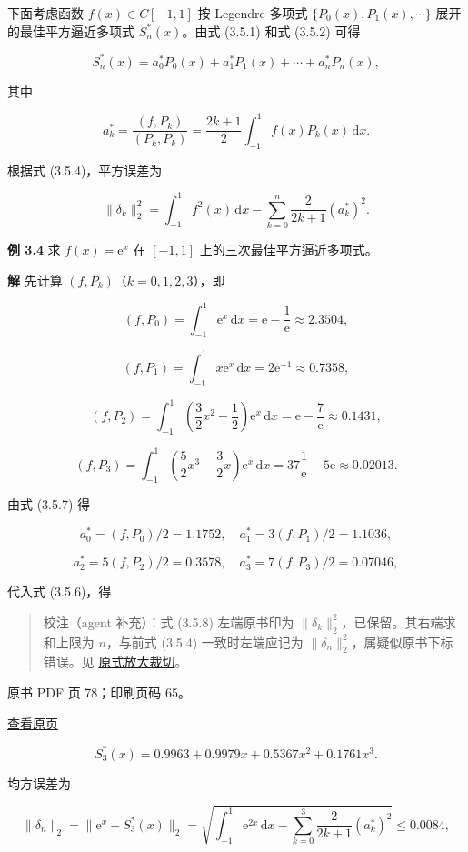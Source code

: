 下面考虑函数 \(f(x)\in C[-1,1]\) 按 Legendre 多项式 \(\{P_0(x),P_1(x),\cdots\}\) 展开的最佳平方逼近多项式 \(S_n^*(x)\)。由式 (3.5.1) 和式 (3.5.2) 可得

\[
S_n^*(x)=a_0^*P_0(x)+a_1^*P_1(x)+\cdots+a_n^*P_n(x),\tag{3.5.6}
\]

其中

\[
a_k^*=\frac{(f,P_k)}{(P_k,P_k)}=\frac{2k+1}{2}\int_{-1}^1f(x)P_k(x)\,\mathrm dx.\tag{3.5.7}
\]

根据式 (3.5.4)，平方误差为

\[
\|\delta_k\|_2^2=\int_{-1}^1 f^2(x)\,\mathrm dx-\sum_{k=0}^n\frac{2}{2k+1}(a_k^*)^2.\tag{3.5.8}
\]

\textbf{例 3.4} 求 \(f(x)=\mathrm e^x\) 在 \([-1,1]\) 上的三次最佳平方逼近多项式。

\textbf{解} 先计算 \((f,P_k)\)（\(k=0,1,2,3\)），即

\[
(f,P_0)=\int_{-1}^1\mathrm e^x\,\mathrm dx=\mathrm e-\frac1{\mathrm e}\approx2.3504,
\]

\[
(f,P_1)=\int_{-1}^1x\mathrm e^x\,\mathrm dx=2\mathrm e^{-1}\approx0.7358,
\]

\[
(f,P_2)=\int_{-1}^1\left(\frac32x^2-\frac12\right)\mathrm e^x\,\mathrm dx=\mathrm e-\frac7{\mathrm e}\approx0.1431,
\]

\[
(f,P_3)=\int_{-1}^1\left(\frac52x^3-\frac32x\right)\mathrm e^x\,\mathrm dx=37\frac1{\mathrm e}-5\mathrm e\approx0.02013.
\]

由式 (3.5.7) 得

\[
a_0^*=(f,P_0)/2=1.1752,\quad a_1^*=3(f,P_1)/2=1.1036,
\]

\[
a_2^*=5(f,P_2)/2=0.3578,\quad a_3^*=7(f,P_3)/2=0.07046,
\]

代入式 (3.5.6)，得

\begin{quote}
校注（agent 补充）：式 (3.5.8) 左端原书印为 \(\|\delta_k\|_2^2\)，已保留。其右端求和上限为 \(n\)，与前式 (3.5.4) 一致时左端应记为 \(\|\delta_n\|_2^2\)，属疑似原书下标错误。见 \href{verified/assets/ch03b/p077-error-formula.png}{原式放大裁切}。
\end{quote}

\clearpage

原书 PDF 页 78；印刷页码 65。

\href{source-images/pdf-078.jpeg}{查看原页}

\[
S_3^*(x)=0.9963+0.9979x+0.5367x^2+0.1761x^3.
\]

均方误差为

\[
\|\delta_n\|_2=\|\mathrm e^x-S_3^*(x)\|_2=\sqrt{\int_{-1}^1\mathrm e^{2x}\,\mathrm dx-\sum_{k=0}^3\frac{2}{2k+1}(a_k^*)^2}\leqslant0.0084,
\]

